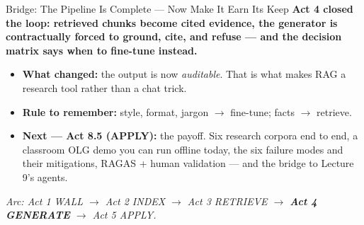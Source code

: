 \begin{frame}{Bridge: The Pipeline Is Complete --- Now Make It Earn Its Keep}
\textbf{Act 4 closed the loop: retrieved chunks become cited evidence, the generator is contractually forced to ground, cite, and refuse --- and the decision matrix says when to fine-tune instead.}

\medskip
\begin{itemize}
\item \textbf{What changed:} the output is now \emph{auditable}. That is what makes RAG a research tool rather than a chat trick.

\medskip
\item \textbf{Rule to remember:} style, format, jargon $\to$ fine-tune; facts $\to$ retrieve.

\medskip
\item \textbf{Next --- Act 8.5 (APPLY):} the payoff. Six research corpora end to end, a classroom OLG demo you can run offline today, the six failure modes and their mitigations, RAGAS + human validation --- and the bridge to Lecture 9's agents.
\end{itemize}

\bigskip
\centering
\footnotesize\textit{Arc: Act 1 WALL $\to$ Act 2 INDEX $\to$ Act 3 RETRIEVE $\to$ \textbf{Act 4 GENERATE} $\to$ Act 5 APPLY.}
\end{frame}


